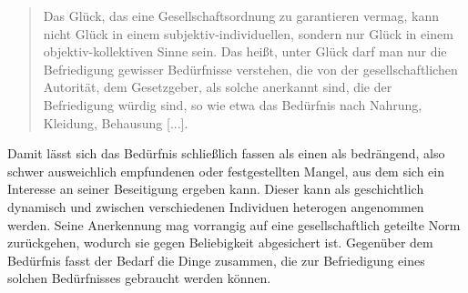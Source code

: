 \documentclass[a4paper]{thesis}
\begin{document}
\begin{quote}
Das Glück, das eine Gesellschaftsordnung zu garantieren vermag, kann nicht Glück in einem subjektiv-individuellen, sondern nur Glück in einem objektiv-kollektiven Sinne sein. Das heißt, unter Glück darf man nur die Befriedigung gewisser Bedürfnisse verstehen, die von der gesellschaftlichen Autorität, dem Gesetzgeber, als solche anerkannt sind, die der Befriedigung würdig sind, so wie etwa das Bedürfnis nach Nahrung, Kleidung, Behausung [...].
\end{quote}

Damit lässt sich das Bedürfnis schließlich fassen als einen als bedrängend, also schwer ausweichlich empfundenen oder festgestellten Mangel, aus dem sich ein Interesse an seiner Beseitigung ergeben kann. Dieser kann als geschichtlich dynamisch und zwischen verschiedenen Individuen heterogen angenommen werden. Seine Anerkennung mag vorrangig auf eine gesellschaftlich geteilte Norm zurückgehen, wodurch sie gegen Beliebigkeit abgesichert ist. Gegenüber dem Bedürfnis fasst der Bedarf die Dinge zusammen, die zur Befriedigung eines solchen Bedürfnisses gebraucht werden können.
\end{document}
